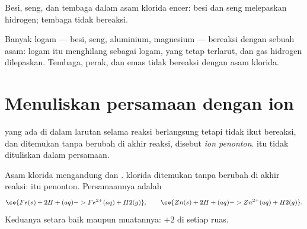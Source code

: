 \begin{omfigure}

{\small Besi, seng, dan tembaga dalam asam klorida encer: besi dan seng
melepaskan hidrogen; tembaga tidak bereaksi.}
\end{omfigure}

\begin{proposition}\label{prop:g9:metals-acids-corrosion:acid}
Banyak logam --- besi, seng, aluminium, magnesium --- bereaksi dengan
  sebuah asam: logam itu menghilang sebagai  logam,
yang tetap terlarut, dan gas hidrogen dilepaskan. Tembaga, perak, dan
emas tidak bereaksi dengan asam klorida.
\end{proposition}

\section{Menuliskan persamaan dengan ion}

\begin{definition}\label{def:g9:metals-acids-corrosion:spectator}
 yang ada di dalam larutan selama reaksi berlangsung tetapi tidak
ikut bereaksi, dan ditemukan tanpa berubah di akhir reaksi, disebut
\emph{ion penonton}.  itu tidak dituliskan dalam
persamaan.
\end{definition}

\begin{example}\label{ex:g9:metals-acids-corrosion:iron}
Asam klorida mengandung   dan .  klorida
ditemukan tanpa berubah di akhir reaksi:  itu penonton.
Persamaannya adalah
\[
  \ce{Fe(s) + 2H+(aq) -> Fe^{2+}(aq) + H2(g)}, \qquad
  \ce{Zn(s) + 2H+(aq) -> Zn^{2+}(aq) + H2(g)}.
\]
Keduanya setara baik  maupun muatannya: $+2$ di setiap ruas.
\end{example}

